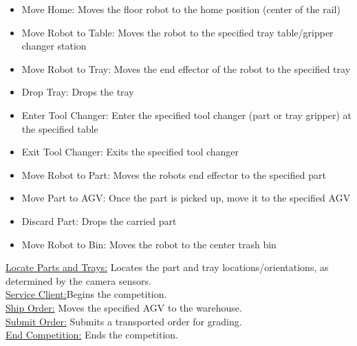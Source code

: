\documentclass{uva-inf-article}
\begin{document}
\begin{itemize}
    \item Move Home:                      Moves the floor robot to the home position (center of the rail)

    \item Move Robot to Table:       Moves the robot to the specified tray table/gripper changer station

    \item Move Robot to Tray:         Moves the end effector of the robot to the specified tray

    \item Drop Tray:                          Drops the tray

    \item Enter Tool Changer:         Enter the specified tool changer (part or tray gripper) at the specified table

    \item Exit Tool Changer:            Exits the specified tool changer

    \item Move Robot to Part:         Moves the robots end effector to the specified part

    \item Move Part to AGV:            Once the part is picked up, move it to the specified AGV

    \item Discard Part:                      Drops the carried part

    \item Move Robot to Bin:           Moves the robot to the center trash bin 
\\
\end{itemize}

\noindent \underline{Locate Parts and Trays:}   Locates the part and tray locations/orientations, as determined by the camera sensors.\\

\noindent \underline{Service Client:}Begins the competition.\\

\noindent \underline{Ship Order:} Moves the specified AGV to the warehouse.\\

\noindent \underline{Submit Order:} Submits a transported order for grading.\\

\noindent \underline{End Competition:} Ends the competition.\\\\
\end{document}
